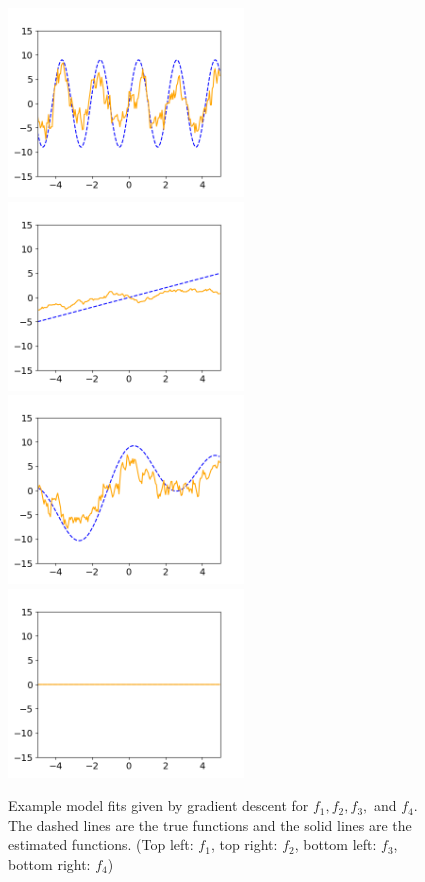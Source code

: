 \documentclass[12pt]{article}
\begin{document}
\begin{figure}[ht]
\caption{Example model fits given by gradient descent for $f_1, f_2, f_3,$ and $ f_4$. The dashed lines are the true functions and the solid lines are the estimated functions. (Top left: $f_1$, top right: $f_2$, bottom left: $f_3$, bottom right: $f_4$)}
\centering
\includegraphics[height=50mm]{sparse_add_model_3_20_100_50_50_func0.png}
\includegraphics[height=50mm]{sparse_add_model_3_20_100_50_50_func1.png}
\includegraphics[height=50mm]{sparse_add_model_3_20_100_50_50_func2.png}
\includegraphics[height=50mm]{sparse_add_model_3_20_100_50_50_func3.png}
\label{fig:additive}
\end{figure}
\end{document}
